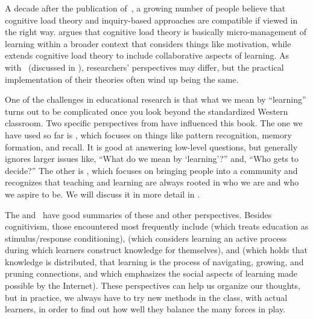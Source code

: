 A decade after the publication of~\cite{Kirs2006},
a growing number of people believe that cognitive load theory and inquiry-based approaches are compatible
if viewed in the right way.
\cite{Kaly2015} argues that cognitive load theory is basically micro-management of learning
within a broader context that considers things like motivation,
while~\cite{Kirs2018} extends cognitive load theory to include collaborative aspects of learning.
As with~\cite{Mark2018} (discussed in ),
researchers' perspectives may differ,
but the practical implementation of their theories often wind up being the same.

One of the challenges in educational research is that
what we mean by ``learning'' turns out to be complicated
once you look beyond the standardized Western classroom.
Two specific perspectives from  have influenced this book.
The one we have used so far is ,
which focuses on things like pattern recognition, memory formation, and recall.
It is good at answering low-level questions,
but generally ignores larger issues like,
``What do we mean by `learning'?''
and, ``Who gets to decide?''
The other is ,
which focuses on bringing people into a community
and recognizes that
teaching and learning are always rooted in who we are and who we aspire to be.
We will discuss it in more detail in .

The 
and~\cite{Wibu2016}
have good summaries of these and other perspectives.
Besides cognitivism,
those encountered most frequently include 
(which treats education as stimulus/response conditioning),
(which considers learning an active process during which learners construct knowledge for themselves),
and 
(which holds that knowledge is distributed,
that learning is the process of navigating, growing, and pruning connections,
and which emphasizes the social aspects of learning made possible by the Internet).
These perspectives can help us organize our thoughts,
but in practice,
we always have to try new methods in the class,
with actual learners,
in order to find out how well they balance the many forces in play.




